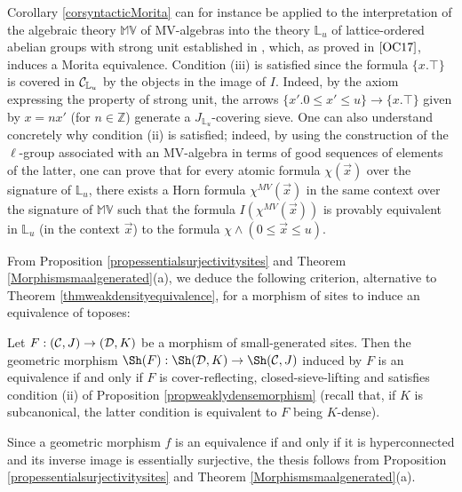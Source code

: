 \documentclass[a4paper,12pt]{article}
\begin{document}
\begin{example}
	Corollary \ref{corsyntacticMorita} can for instance be applied to the interpretation of the algebraic theory $\mathbb{MV}$ of MV-algebras into the theory ${\mathbb L}_{u}$ of lattice-ordered abelian groups with strong unit established in \cite{OC17}, which, as proved in $\cite{OC17}$, induces a Morita equivalence. Condition (iii) is satisfied since the formula $\{x. \top\}$ is covered in ${\cal C}_{{\mathbb L}_{u}}$ by the objects in the image of $I$. Indeed, by the axiom expressing the property of strong unit, the arrows $\{x'. 0\leq x'\leq u\}\to \{x. \top\}$ given by $x=nx'$ (for $n\in {\mathbb Z}$) generate a $J_{{\mathbb L}_{u}}$-covering sieve. One can also understand concretely why condition (ii) is satisfied; indeed, by using the construction of the $\ell$-group associated with an MV-algebra in terms of good sequences of elements of the latter, one can prove that for every atomic formula $\chi(\vec{x})$ over the signature of ${\mathbb L}_{u}$, there exists a Horn formula $\chi^{MV}(\vec{x})$ in the same context over the signature of $\mathbb{MV}$ such that the formula $I(\chi^{MV}(\vec{x}))$ is provably equivalent in ${\mathbb L}_{u}$ (in the context $\vec{x}$) to the formula $\chi \wedge (0\leq \vec{x} \leq u)$.
\end{example}

From Proposition \ref{propessentialsurjectivitysites} and Theorem \ref{Morphismsmaalgenerated}(a), we deduce the following criterion, alternative to Theorem \ref{thmweakdensityequivalence}, for a morphism of sites to induce an equivalence of toposes:
	
\begin{corollary}\label{corquivalencesites}
Let $F:({\cal C}, J)\to ({\cal D}, K)$ be a morphism of small-generated sites. Then the geometric morphism $\Sh(F):\Sh({\cal D}, K) \to \Sh({\cal C}, J)$ induced by $F$ is an equivalence if and only if $F$ is cover-reflecting, closed-sieve-lifting and satisfies condition (ii) of Proposition \ref{propweaklydensemorphism} (recall that, if $K$ is subcanonical, the latter condition is equivalent to $F$ being $K$-dense).
\end{corollary}	

\begin{proofs}
Since a geometric morphism $f$ is an equivalence if and only if it is hyperconnected and its inverse image is essentially surjective, the thesis follows from Proposition \ref{propessentialsurjectivitysites} and Theorem \ref{Morphismsmaalgenerated}(a).	
\end{proofs}
\end{document}
